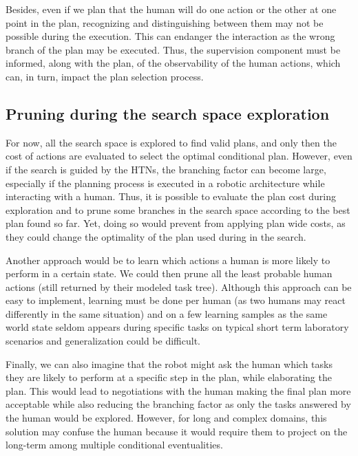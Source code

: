 \documentclass[a4paper,11pt,twoside]{StyleThese}
\begin{document}
Besides, even if we plan that the human will do one action or the other at one point in the plan, recognizing and distinguishing between them may not be possible during the execution. This can endanger the interaction as the wrong branch of the plan may be executed. Thus, the supervision component must be informed, along with the plan, of the observability of the human actions, which can, in turn, impact the plan selection process.


\subsection{Pruning during the search space exploration}
For now, all the search space is explored to find valid plans, and only then the cost of actions are evaluated to select the optimal conditional plan. However, even if the search is guided by the HTNs, the branching factor can become large, especially if the planning process is executed in a robotic architecture while interacting with a human. Thus, it is possible to evaluate the plan cost during exploration and to prune some branches in the search space according to the best plan found so far. Yet, doing so would prevent from applying plan wide costs, as they could change the optimality of the plan used during in the search.

Another approach would be to learn which actions a human is more likely to perform in a certain state. We could then prune all the least probable human actions (still returned by their modeled task tree). Although this approach can be easy to implement, learning must be done per human (as two humans may react differently in the same situation) and on a few learning samples as the same world state seldom appears during specific tasks on typical short term laboratory scenarios and generalization could be difficult.

Finally, we can also imagine that the robot might ask the human which tasks they are likely to perform at a specific step in the plan, while elaborating the plan. This would lead to negotiations with the human making the final plan more acceptable while also reducing the branching factor as only the tasks answered by the human would be explored. However, for long and complex domains, this solution may confuse the human because it would require them to project on the long-term among multiple conditional eventualities.

\ifdefined{}
\else


\end{document}
